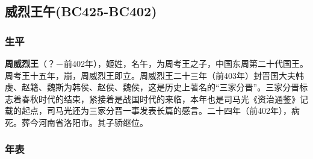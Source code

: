 
\subsection{威烈王午\tiny(BC425-BC402)}

\subsubsection{生平}

\textbf{周威烈王}（？－前402年），姬姓，名午，为周考王之子，中国东周第二十代国王。周考王十五年，崩，周威烈王即立。周威烈王二十三年（前403年）封晋国大夫韩虔、赵籍、魏斯为韩侯、赵侯、魏侯，这是历史上著名的“三家分晋”。三家分晋标志着春秋时代的结束，紧接着是战国时代的来临，本年也是司马光《资治通鉴》记载的起点，司马光还为三家分晋一事发表长篇的感言。二十四年（前402年），病死。葬今河南省洛阳市。其子骄继位。

\subsubsection{年表}

